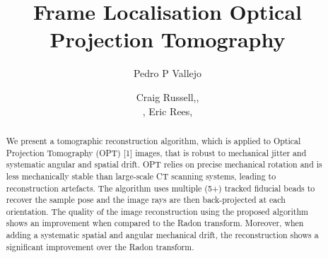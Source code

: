 \documentclass{osa-article}
\begin{document}
\title{Frame Localisation Optical Projection Tomography}

\author{Craig Russell,, \author{Pedro P Vallejo}, Eric Rees,}

\address{Department of Chemical Engineering and Biotechnology, University of Cambridge,}
\address{National Physical Laboratory, }


\begin{abstract}
  We present a tomographic reconstruction algorithm, which is applied to Optical Projection Tomography (OPT) [1] images, that is robust to mechanical jitter and systematic angular and spatial drift.
  OPT relies on precise mechanical rotation and is less mechanically stable than large-scale CT scanning systems, leading to reconstruction artefacts.
  The algorithm uses multiple (5+) tracked fiducial beads to recover the sample pose and the image rays are then back-projected at each orientation.
  The quality of the image reconstruction using the proposed algorithm shows an improvement when compared to the Radon transform.
  Moreover, when adding a systematic spatial and angular mechanical drift, the reconstruction shows a significant improvement over the Radon transform.
\end{abstract}



%
\end{document}
